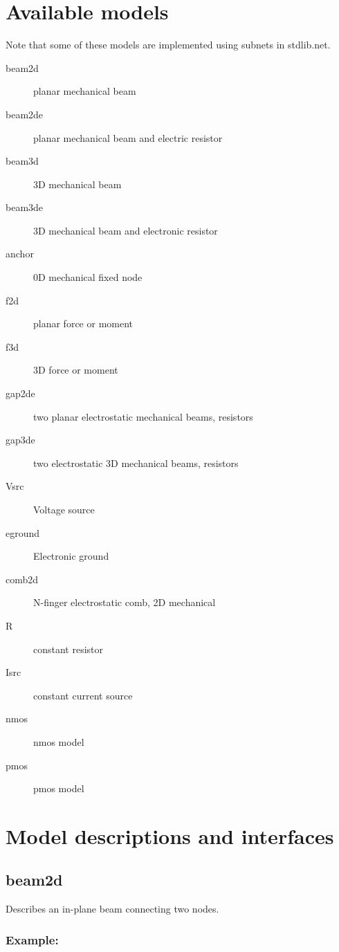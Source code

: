 

\section{Available models}

Note that some of these models are implemented using subnets in
stdlib.net.

\begin{description}
  \item[beam2d]     planar mechanical beam 
  \item[beam2de]    planar mechanical beam and electric resistor 
  \item[beam3d]     3D mechanical beam 
  \item[beam3de]    3D mechanical beam and electronic resistor 
  \item[anchor]     0D  mechanical  fixed  node 
  \item[f2d]        planar force or moment 
  \item[f3d]        3D force or moment 
  \item[gap2de]     two planar electrostatic mechanical beams, resistors  
  \item[gap3de]     two electrostatic 3D mechanical beams, resistors 
  \item[Vsrc]       Voltage source 
  \item[eground]    Electronic ground  
  \item[comb2d]     N-finger electrostatic comb, 2D mechanical  
  \item[R]          constant resistor 
  \item[Isrc]       constant current source 
  \item[nmos]       nmos model 
  \item[pmos]       pmos model 
\end{description}


\section{Model descriptions and interfaces}


\subsection{beam2d}
 
Describes an in-plane beam connecting two nodes.

\subsubsection*{Example:}

